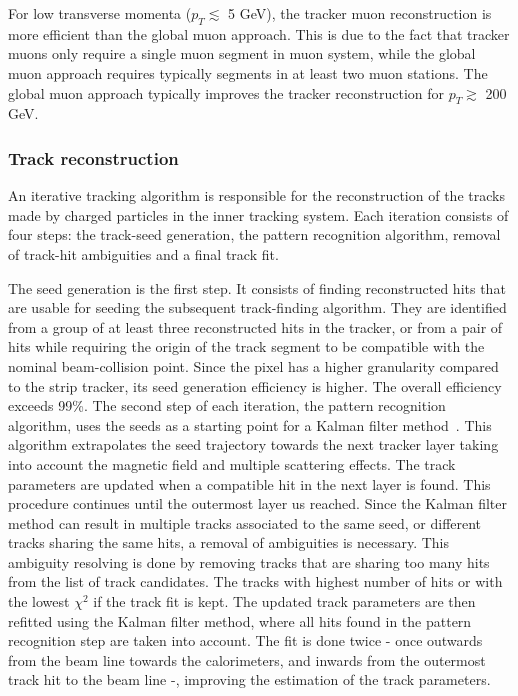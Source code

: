 For low transverse momenta ($p_T \lesssim$ 5 \si{ \GeV}), the tracker muon reconstruction is  more efficient than the global muon approach. This is due to the fact that tracker muons only require a single muon  segment in muon system, while the global muon approach requires typically segments in at least two muon stations. The global muon approach typically improves the tracker reconstruction for $p_T\gtrsim$ 200 \si{ \GeV}.
\subsubsection*{Track reconstruction}

An iterative tracking algorithm is responsible for the reconstruction of the tracks made by charged particles in the inner tracking system. Each iteration consists of four steps\cite{Bayatian:922757}: the track-seed generation, the pattern recognition algorithm, removal of track-hit ambiguities and a final track fit. 

The seed generation is the first step. It consists of finding reconstructed hits that are usable for seeding the subsequent track-finding algorithm. They are identified from a group of at least three reconstructed hits in the tracker, or from a pair of hits while requiring the origin of the track segment to be compatible with the nominal beam-collision point. Since the pixel has a higher granularity compared to the strip tracker, its seed generation efficiency is higher. The overall efficiency exceeds 99\%.
The second step of each iteration, the pattern recognition algorithm, uses the seeds as a starting point for a Kalman filter method~\cite{FRUHWIRTH1987444,Billoir:1989mh}. This algorithm extrapolates the seed trajectory towards the next tracker layer taking into account the magnetic field and multiple scattering effects. The track parameters are updated when a compatible hit in the next layer is found. This procedure continues until the outermost layer us reached.
Since the Kalman filter method can result in multiple tracks associated to the same seed, or different tracks sharing the same hits, a removal of ambiguities is necessary. This ambiguity resolving is done by removing tracks that are sharing too many hits from the list of track candidates. The tracks with highest number of hits or with the lowest $\chi^2$ if the track fit is kept. 
The updated track parameters are then refitted using the Kalman filter method, where all hits found in the pattern recognition step are taken into account. The fit is done twice - once outwards from the beam line towards the calorimeters, and inwards from the outermost track hit to the beam line -, improving the estimation of the track parameters. 

